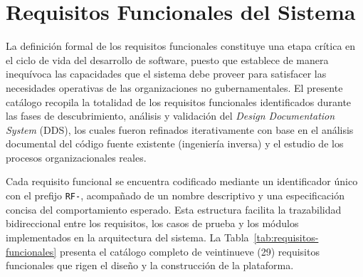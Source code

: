 
\section{Requisitos Funcionales del Sistema}
\label{sec:requisitos-funcionales}

La definici\'on formal de los requisitos funcionales constituye una etapa cr\'itica
en el ciclo de vida del desarrollo de software, puesto que establece de manera
inequ\'ivoca las capacidades que el sistema debe proveer para satisfacer las
necesidades operativas de las organizaciones no gubernamentales. El presente
cat\'alogo recopila la totalidad de los requisitos funcionales identificados
durante las fases de descubrimiento, an\'alisis y validaci\'on del \textit{Design
Documentation System} (DDS), los cuales fueron refinados iterativamente con
base en el an\'alisis documental del c\'odigo fuente existente (ingenier\'ia
inversa) y el estudio de los procesos organizacionales reales.

Cada requisito funcional se encuentra codificado mediante un identificador
\'unico con el prefijo \texttt{RF-}, acompa\~nado de un nombre descriptivo y una
especificaci\'on concisa del comportamiento esperado. Esta estructura facilita
la trazabilidad bidireccional entre los requisitos, los casos de prueba y los
m\'odulos implementados en la arquitectura del sistema. La Tabla~\ref{tab:requisitos-funcionales}
presenta el cat\'alogo completo de veintinueve (29) requisitos funcionales que
rigen el dise\~no y la construcci\'on de la plataforma.

